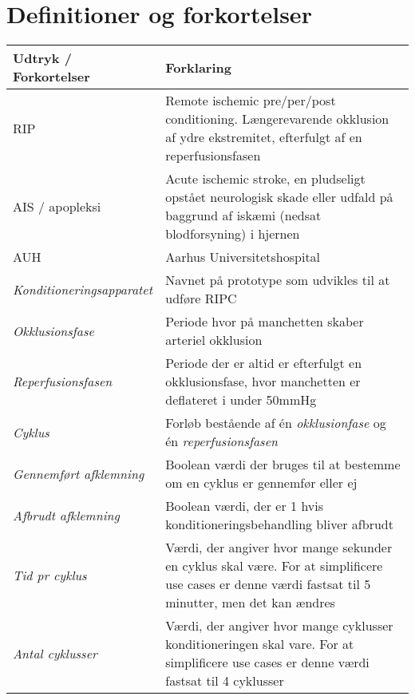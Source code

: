 	\section{Definitioner og forkortelser}
	\begin{longtable}{ |p{} |p{}| } 
		\hline
		\rowcolor{usDef}
		\textbf{Udtryk / Forkortelser} &  \textbf{Forklaring} \\
		\hline
		RIP & Remote ischemic pre/per/post conditioning. Længerevarende okklusion af ydre ekstremitet, efterfulgt af en reperfusionsfasen\\
		\hline
		AIS / apopleksi & Acute ischemic stroke, en pludseligt opstået neurologisk skade eller udfald på baggrund af iskæmi (nedsat blodforsyning) i hjernen \\
		\hline
		AUH & Aarhus Universitetshospital \\
		\hline
		\textit{Konditioneringsapparatet} & Navnet på prototype som udvikles til at udføre RIPC \\
		\hline
		\textit{Okklusionsfase} & Periode hvor på manchetten skaber arteriel okklusion \\
		\hline
		\textit{Reperfusionsfasen} & Periode der er altid er efterfulgt en okklusionsfase, hvor manchetten er deflateret i under 50mmHg\\
		\hline
		\textit{Cyklus} & Forløb bestående af én \textit{okklusionfase} og én \textit{reperfusionsfasen} \\
		\hline
		\textit{Gennemført afklemning} & Boolean værdi der bruges til at bestemme om en cyklus er gennemfør eller ej \\
		\hline
		\textit{Afbrudt afklemning} & Boolean værdi, der er 1 hvis konditioneringsbehandling bliver afbrudt \\ 
		\hline
		\textit{Tid pr cyklus} & Værdi, der angiver hvor mange sekunder en cyklus skal være. For at simplificere use cases er denne værdi fastsat til 5 minutter, men det kan ændres \\
		\hline
		\textit{Antal cyklusser} & Værdi, der angiver hvor mange cyklusser konditioneringen skal vare. For at simplificere use cases er denne værdi fastsat til 4 cyklusser \\
		\hline
	\end{longtable}
	
	\newpage

